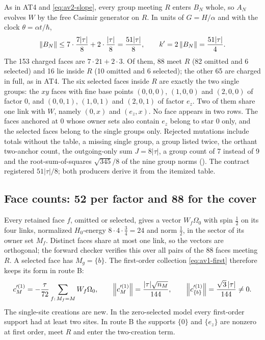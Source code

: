 As in AT4 and \eqref{eq:av2-slope}, every group meeting $R$ enters $B_N$
whole, so $A_N$ evolves $W$ by the free Casimir generator on $R$. In units of
$G=H/\alpha$ and with the clock $\theta=\alpha t/\hbar$,
\begin{equation}
 \left\lVert B_N\right\rVert\le7\cdot\frac{7|\tau|}8+2\cdot\frac{|\tau|}8=\frac{51|\tau|}8,\qquad
 k'=2\left\lVert B_N\right\rVert=\frac{51|\tau|}4 .
 \label{eq:ax1-slope}
\end{equation}
The 153 charged faces are $7\cdot21+2\cdot3$. Of them, 88 meet $R$ (82
omitted and 6 selected) and 16 lie inside $R$ (10 omitted and 6 selected); the
other 65 are charged in full, as in AT4. The six selected faces inside $R$
are exactly the two single groups: the $xy$ faces with fine base points
$(0,0,0)$, $(1,0,0)$ and $(2,0,0)$ of factor $0$, and $(0,0,1)$, $(1,0,1)$ and
$(2,0,1)$ of factor $e_z$. Two of them share one link with $W$, namely $(0,x)$
and $(e_z,x)$. No face appears in two rows. The faces anchored at $0$ whose
owner sets also contain $e_z$ belong to star $0$ only, and the selected faces
belong to the single groups only. Rejected mutations include totals without
the table, a missing single group, a group listed twice, the orthant
two-anchor count, the outgoing-only sum $J=8|\tau|$, a group count of 7
instead of 9 and the root-sum-of-squares $\sqrt{345}/8$ of the nine group
norms (). The contract registered $51|\tau|/8$; both
producers derive it from the itemized table.

\subsection{Face counts: 52 per factor and 88 for the cover}
\label{sec:ax1-counts}
Every retained face $f$, omitted or selected, gives a vector $W_f\Omega_0$
with spin $\tfrac12$ on its four links, normalized $H_0$-energy
$8\cdot4\cdot\tfrac34=24$ and norm $\tfrac12$, in the sector of its owner set
$M_f$. Distinct faces share at most one link, so the vectors are orthogonal;
the forward checker verifies this over all pairs of the 88 faces meeting $R$.
A selected face has $M_g=\{b\}$. The first-order collection
\eqref{eq:av1-first} therefore keeps its form in route B:
\begin{equation}
 c'^{(1)}_M=-\frac\tau{72}\sum_{f:\,M_f=M}W_f\Omega_0,\qquad
 \left\lVert c'^{(1)}_M\right\rVert=\frac{|\tau|\sqrt{n_M}}{144},\qquad
 \left\lVert c'^{(1)}_{\{b\}}\right\rVert=\frac{\sqrt3\,|\tau|}{144}\ne0 .
 \label{eq:ax1-first}
\end{equation}
The single-site creations are new. In the zero-selected model every
first-order support had at least two sites. In route B the supports $\{0\}$
and $\{e_z\}$ are nonzero at first order, meet $R$ and enter the two-creation
term.

